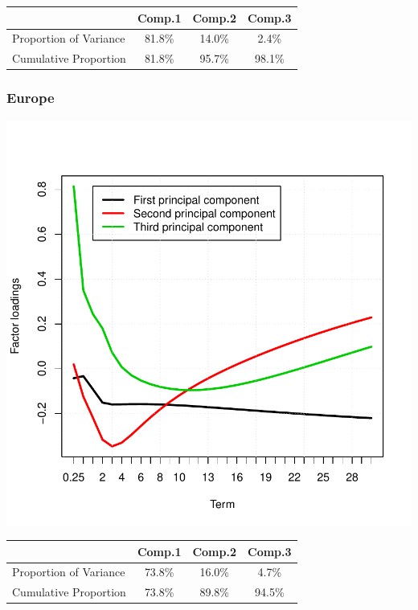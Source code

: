 \documentclass{article}
\begin{document}
\begin{spacing}{1.5}
\begin{center}
\begin{tabular}{|l||c||c||c|}\hline
                        & Comp.1 & Comp.2 & Comp.3 \\ \hline
Proportion of Variance  & 81.8\%& 14.0\% & 2.4\% \\ \hline
Cumulative Proportion   & 81.8\%&95.7\% & 98.1\%\\ \hline
\end{tabular}
\end{center}


 \subsubsection{Europe}

\includegraphics{Graduation_Paper-030}

\begin{center}
\begin{tabular}{|l||c||c||c|}\hline
                        & Comp.1 & Comp.2 & Comp.3 \\ \hline
Proportion of Variance  & 73.8\%& 16.0\% & 4.7\% \\ \hline
Cumulative Proportion   & 73.8\%& 89.8\% & 94.5\%\\ \hline
\end{tabular}
\end{center}


\end{spacing}
\end{document}
